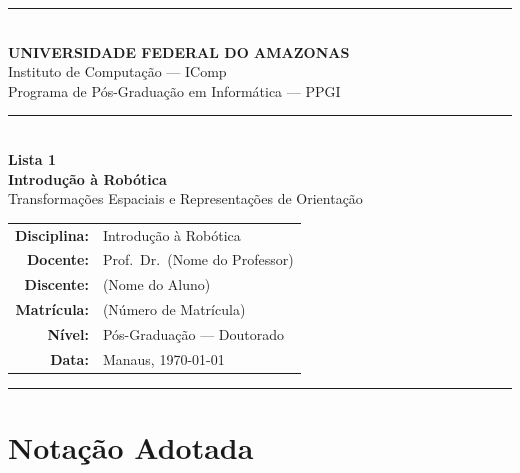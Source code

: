 \documentclass[12pt,a4paper]{article}
\begin{document}
\begin{titlepage}
\centering
\vspace*{0.5cm}

{\color{ufamblue}\rule{\linewidth}{2pt}}\\[0.4cm]
{\Large\bfseries\color{ufamblue} UNIVERSIDADE FEDERAL DO AMAZONAS}\\[0.2cm]
{\large\color{ufamblue} Instituto de Computação --- IComp}\\[0.1cm]
{\large\color{ufamblue} Programa de Pós-Graduação em Informática --- PPGI}\\[0.4cm]
{\color{ufamblue}\rule{\linewidth}{2pt}}\\[2.5cm]

{\LARGE\bfseries Lista 1}\\[0.4cm]
{\Large\bfseries Introdução à Robótica}\\[0.3cm]
{\large Transformações Espaciais e Representações de Orientação}\\[3cm]

\begin{tabular}{rl}
  \textbf{Disciplina:} & Introdução à Robótica \\[0.3cm]
  \textbf{Docente:}    & Prof.\ Dr.\ (Nome do Professor) \\[0.3cm]
  \textbf{Discente:}   & (Nome do Aluno) \\[0.3cm]
  \textbf{Matrícula:}  & (Número de Matrícula) \\[0.3cm]
  \textbf{Nível:}      & Pós-Graduação --- Doutorado \\[0.3cm]
  \textbf{Data:}       & Manaus, \today \\
\end{tabular}

\vfill
{\color{ufamblue}\rule{\linewidth}{1.5pt}}
\end{titlepage}

\newpage
\tableofcontents
\newpage

\section*{Notação Adotada}
\end{document}
